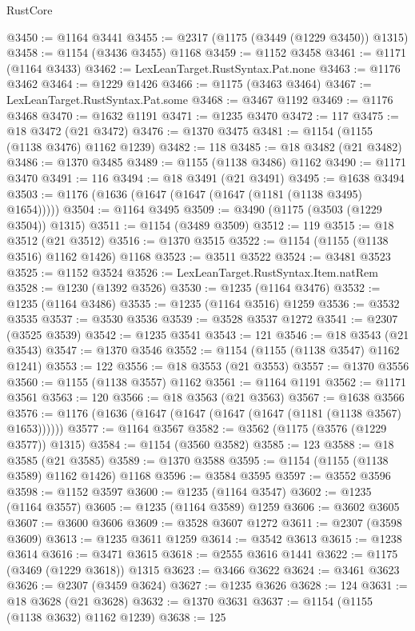 \begin{lexlean}{RustCore}
\begin{coremodule}
@3450 := @1164 @3441
@3455 := @2317 (@1175 (@3449 (@1229 @3450)) @1315)
@3458 := @1154 (@3436 @3455) @1168
@3459 := @1152 @3458
@3461 := @1171 (@1164 @3433)
@3462 := LexLeanTarget.RustSyntax.Pat.none
@3463 := @1176 @3462
@3464 := @1229 @1426
@3466 := @1175 (@3463 @3464)
@3467 := LexLeanTarget.RustSyntax.Pat.some
@3468 := @3467 @1192
@3469 := @1176 @3468
@3470 := @1632 @1191
@3471 := @1235 @3470
@3472 := 117
@3475 := @18 @3472 (@21 @3472)
@3476 := @1370 @3475
@3481 := @1154 (@1155 (@1138 @3476) @1162 @1239)
@3482 := 118
@3485 := @18 @3482 (@21 @3482)
@3486 := @1370 @3485
@3489 := @1155 (@1138 @3486) @1162
@3490 := @1171 @3470
@3491 := 116
@3494 := @18 @3491 (@21 @3491)
@3495 := @1638 @3494
@3503 := @1176 (@1636 (@1647 (@1647 (@1647 (@1181 (@1138 @3495) @1654)))))
@3504 := @1164 @3495
@3509 := @3490 (@1175 (@3503 (@1229 @3504)) @1315)
@3511 := @1154 (@3489 @3509)
@3512 := 119
@3515 := @18 @3512 (@21 @3512)
@3516 := @1370 @3515
@3522 := @1154 (@1155 (@1138 @3516) @1162 @1426) @1168
@3523 := @3511 @3522
@3524 := @3481 @3523
@3525 := @1152 @3524
@3526 := LexLeanTarget.RustSyntax.Item.natRem
@3528 := @1230 (@1392 @3526)
@3530 := @1235 (@1164 @3476)
@3532 := @1235 (@1164 @3486)
@3535 := @1235 (@1164 @3516) @1259
@3536 := @3532 @3535
@3537 := @3530 @3536
@3539 := @3528 @3537 @1272
@3541 := @2307 (@3525 @3539)
@3542 := @1235 @3541
@3543 := 121
@3546 := @18 @3543 (@21 @3543)
@3547 := @1370 @3546
@3552 := @1154 (@1155 (@1138 @3547) @1162 @1241)
@3553 := 122
@3556 := @18 @3553 (@21 @3553)
@3557 := @1370 @3556
@3560 := @1155 (@1138 @3557) @1162
@3561 := @1164 @1191
@3562 := @1171 @3561
@3563 := 120
@3566 := @18 @3563 (@21 @3563)
@3567 := @1638 @3566
@3576 := @1176 (@1636 (@1647 (@1647 (@1647 (@1647 (@1181 (@1138 @3567) @1653))))))
@3577 := @1164 @3567
@3582 := @3562 (@1175 (@3576 (@1229 @3577)) @1315)
@3584 := @1154 (@3560 @3582)
@3585 := 123
@3588 := @18 @3585 (@21 @3585)
@3589 := @1370 @3588
@3595 := @1154 (@1155 (@1138 @3589) @1162 @1426) @1168
@3596 := @3584 @3595
@3597 := @3552 @3596
@3598 := @1152 @3597
@3600 := @1235 (@1164 @3547)
@3602 := @1235 (@1164 @3557)
@3605 := @1235 (@1164 @3589) @1259
@3606 := @3602 @3605
@3607 := @3600 @3606
@3609 := @3528 @3607 @1272
@3611 := @2307 (@3598 @3609)
@3613 := @1235 @3611 @1259
@3614 := @3542 @3613
@3615 := @1238 @3614
@3616 := @3471 @3615
@3618 := @2555 @3616 @1441
@3622 := @1175 (@3469 (@1229 @3618)) @1315
@3623 := @3466 @3622
@3624 := @3461 @3623
@3626 := @2307 (@3459 @3624)
@3627 := @1235 @3626
@3628 := 124
@3631 := @18 @3628 (@21 @3628)
@3632 := @1370 @3631
@3637 := @1154 (@1155 (@1138 @3632) @1162 @1239)
@3638 := 125

\end{coremodule}
\end{lexlean}
